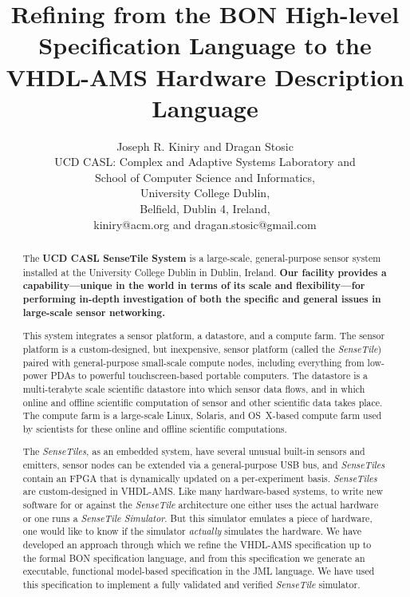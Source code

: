 \documentclass{article}
\newcommand{\ST}{\emph{SenseTile}\xspace}
\newcommand{\STs}{\emph{SenseTiles}\xspace}
\newcommand{\STS}{\emph{SenseTile Simulator}\xspace}
\begin{document}
\title{Refining from the BON High-level Specification Language to the
  VHDL-AMS Hardware Description Language}

\author{Joseph R. Kiniry and Dragan Stosic\\
UCD CASL: Complex and Adaptive Systems Laboratory and\\
School of Computer Science and Informatics,\\
University College Dublin,\\
Belfield, Dublin 4, Ireland,\\
kiniry@acm.org and dragan.stosic@gmail.com\\
}

\maketitle

\begin{abstract}

The \textbf{UCD CASL SenseTile System} is a large-scale, general-purpose
sensor system installed at the University College Dublin in Dublin,
Ireland.  \textbf{Our facility provides a capability---unique in the world in
terms of its scale and flexibility---for performing in-depth
investigation of both the specific and general issues in large-scale
sensor networking.}

This system integrates a sensor platform, a datastore, and a compute
farm.  The sensor platform is a custom-designed, but inexpensive,
sensor platform (called the \ST) paired with general-purpose
small-scale compute nodes, including everything from low-power PDAs to
powerful touchscreen-based portable computers.  The datastore is a
multi-terabyte scale scientific datastore into which sensor data
flows, and in which online and offline scientific computation of
sensor and other scientific data takes place.  The compute farm is a
large-scale Linux, Solaris, and OS~X-based compute farm used by
scientists for these online and offline scientific computations.

The \STs, as an embedded system, have several unusual built-in sensors
and emitters, sensor nodes can be extended via a general-purpose USB bus,
and \STs contain an FPGA that is dynamically updated on a per-experiment
basis.  \STs are custom-designed in VHDL-AMS.  Like many hardware-based systems,
 to write new software for or against the \ST architecture one either uses
the actual hardware or one runs a \STS.  But this simulator emulates a
piece of hardware, one would like to know if the simulator
\emph{actually} simulates the hardware.  We have developed an approach
through which we refine the VHDL-AMS specification up to the formal BON
specification language, and from this specification we generate an
executable, functional model-based specification in the JML language.
We have used this specification to implement a fully validated and
verified \ST simulator.

\end{abstract}
\end{document}
